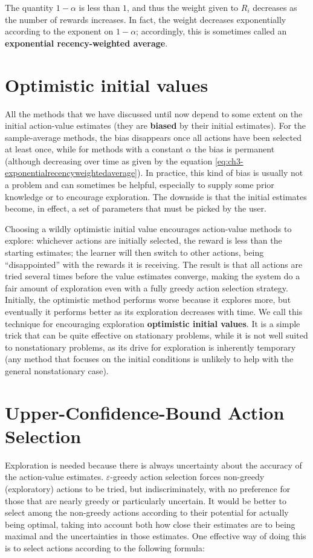 The quantity $1 - \alpha$ is less than $1$, and thus the weight given to $R_i$ decreases as the number of rewards increases. In fact, the weight decreases exponentially according to the exponent on $1 - \alpha$; accordingly, this is sometimes called an \textbf{exponential recency-weighted average}.

\section{Optimistic initial values}
All the methods that we have discussed until now depend to some extent on the initial action-value estimates (they are \textbf{biased} by their initial estimates). For the sample-average methods, the bias disappears once all actions have been selected at least once, while for methods with a constant $\alpha$ the bias is permanent (although decreasing over time as given by the equation \eqref{eq:ch3-exponentialrecencyweightedaverage}). In practice, this kind of bias is usually not a problem and can sometimes be helpful, especially to supply some prior knowledge or to encourage exploration. The downside is that the initial estimates become, in effect, a set of parameters that must be picked by the user.

Choosing a wildly optimistic initial value encourages action-value methods to explore: whichever actions are initially selected, the reward is less than the starting estimates; the learner will then switch to other actions, being ``disappointed'' with the rewards it is receiving. The result is that all actions are tried several times before the value estimates converge, making the system do a fair amount of exploration even with a fully greedy action selection strategy. Initially, the optimistic method performs worse because it explores more, but eventually it performs better as its exploration decreases with time. We call this technique for encouraging exploration \textbf{optimistic initial values}. It is a simple trick that can be quite effective on stationary problems, while it is not well suited to nonstationary problems, as its drive for exploration is inherently temporary (any method that focuses on the initial conditions is unlikely to help with the general nonstationary case).

\section{Upper-Confidence-Bound Action Selection}
Exploration is needed because there is always uncertainty about the accuracy of the action-value estimates. $\varepsilon$-greedy action selection forces non-greedy (exploratory) actions to be tried, but indiscriminately, with no preference for those that are nearly greedy or particularly uncertain. It would be better to select among the non-greedy actions according to their potential for actually being optimal, taking into account both how close their estimates are to being maximal and the uncertainties in those estimates. One effective way of doing this is to select actions according to the following formula:

